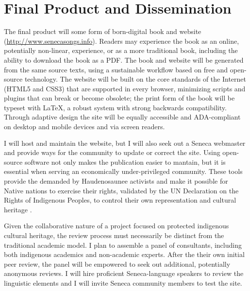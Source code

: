 \documentclass{neh}
\begin{document}
\section{Final Product and Dissemination}

The final product will some form of born-digital book and website
(\url{http://www.senecasongs.info}).
Readers may experience the book as an online, potentially non-linear,
experience, or as a more traditional book, including the ability to download
the book as a PDF.
The book and website will be generated from the same source texts, using a
sustainable workflow based on free and open-source technology.
The website will be built on the core standards of the Internet (HTML5 and
CSS3) that are supported in every browser, minimizing scripts and plugins that
can break or become obsolete; the print form of the book will be typeset with
\LaTeX{}, a robust system with strong backwards compatibility.
Through adaptive design the site will be equally accessible and ADA-compliant
on desktop and mobile devices and via screen readers.

I will host and maintain the website, but I will also seek out a Seneca
webmaster and provide ways for the community to update or correct the site. 
Using open-source software not only makes the publication easier to mantain,
but it is essential when serving an economically under-privileged community.
These tools provide the  demanded by
Haudenosaunee activists and make it possible for Native nations to exercise
their rights, validated by the UN Declaration on the Rights of Indigenous
Peoples, to control their own representation and cultural heritage
\autocite{BasicCall}.

Given the collaborative nature of a project focused on protected indigenous
cultural heritage, the review process must necessarily be distinct from the
traditional academic model.
I plan to assemble a panel of consultants, including both indigenous academics
and non-academic experts.
After the their own initial peer review, the panel will be empowered to seek
out additional, potentially anonymous reviews.
I will hire proficient Seneca-language speakers to review the linguistic
elements and I will invite Seneca community members to test the site.
\end{document}
